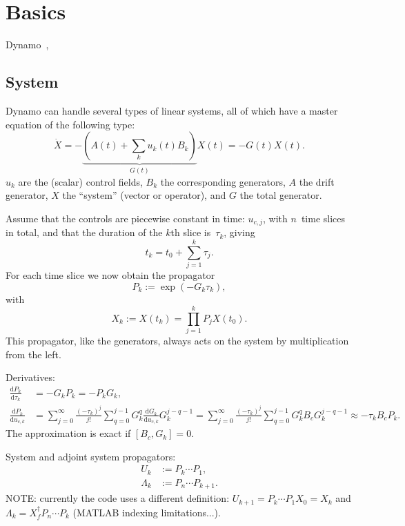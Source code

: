 \documentclass[aps, pra, a4paper, longbibliography]{revtex4}
\newcommand{\be}{\begin{equation}}
\newcommand{\ee}{\end{equation}}
\newcommand{\comm}[2]{\left[ #1, #2 \right]}
\newcommand{\dd}[2]{\frac{\mathrm{d} #1}{\mathrm{d} #2}}
\begin{document}
\tableofcontents

\section{Basics}

Dynamo~\cite{machnes_2011},


\subsection{System}

Dynamo can handle several types of linear systems, all of which have a
master equation of the following type:
\be
\label{eq:master}
\dot{X} = -\underbrace{(A(t) +\sum_k u_k(t) B_k)}_{G(t)} X(t) = -G(t) X(t).
\ee
$u_k$ are the (scalar) control fields, $B_k$ the corresponding generators,
$A$ the drift generator, $X$ the ``system'' (vector or operator), and $G$ the total generator.

Assume that the controls are
piecewise constant in time: $u_{c,j}$, with $n$~time slices in total,
and that the duration of the $k$th slice is~$\tau_k$, giving
\be
t_k = t_0 + \sum_{j=1}^{k} \tau_j.
\ee
For each time slice we now obtain the propagator
\be
P_k := \exp(-G_k \tau_k),
\ee
with
\be
X_k := X(t_k) = \prod_{j=1}^{k} P_j X(t_0).
\ee
This propagator, like the generators, always acts on the system by multiplication
from the left.

Derivatives:
\begin{align}
\dd{P_k}{\tau_k}  &= -G_k P_k = -P_k G_k,\\
\dd{P_k}{u_{c,k}}
&=
\sum_{j=0}^{\infty} \frac{(-\tau_k)^j}{j!}
\sum_{q=0}^{j-1}
G_k^{q} \dd{G_k}{u_{c,k}} G_k^{j-q-1}
=
\sum_{j=0}^{\infty} \frac{(-\tau_k)^j}{j!}
\sum_{q=0}^{j-1}
G_k^{q} B_c G_k^{j-q-1}
\approx -\tau_k B_c P_k.
\end{align}
The approximation is exact if $\comm{B_c}{G_k} = 0$.


System and adjoint system propagators:
\begin{align}
U_k &:= P_k \cdots P_1,\\      %
\Lambda_k &:= P_n \cdots P_{k+1}.
\end{align}
NOTE: currently the code uses a different definition:
$U_{k+1} = P_k \cdots P_1 X_0 = X_k$ and
$\Lambda_k = X_f^\dagger P_n \cdots P_k$ (MATLAB indexing limitations...).
\end{document}
